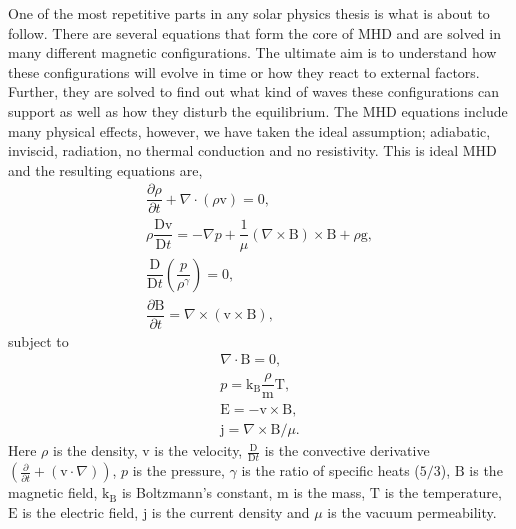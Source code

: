    One of the most repetitive parts in any solar physics thesis is what is about to follow.
    There are several equations that form the core of MHD and are solved in many different magnetic configurations. 
    The ultimate aim is to understand how these configurations will evolve in time or how they react to external factors.
    Further, they are solved to find out what kind of waves these configurations can support as well as how they disturb the equilibrium. 
    The MHD equations include many physical effects, however, we have taken the ideal assumption; adiabatic, inviscid, radiation, no thermal conduction and no resistivity.
    This is ideal MHD and the resulting equations are,
    \begin{align}                                                         
        \dfrac{\partial \rho }{\partial t} + \nabla \cdot (\rho \boldsymbol{\mathrm{v}}) =       
        0,\tag{Mass Conservation}\\                                  
        \rho \dfrac{\mathrm{D}\boldsymbol{\mathrm{v}}}{\mathrm{D}t} =
        -\nabla p + \dfrac{1}{\mu}(\nabla \times \boldsymbol{\mathrm{B}}) \times \boldsymbol{\mathrm{B}} + \rho \boldsymbol{\mathrm{g}},\tag{Equation of Motion}\\
        \dfrac{\mathrm{D}}{\mathrm{D}t} \left(\dfrac{p}{\rho^\gamma} \right)  = 0,\tag{Energy Equation}\\       
        \dfrac{\partial \boldsymbol{\mathrm{B}}}{\partial t} = \nabla \times (\boldsymbol{\mathrm{v}} \times \boldsymbol{\mathrm{B}}),\tag{Induction Equation}               
    \end{align}
    subject to
    \begin{align}
        \nabla \cdot \boldsymbol{\mathrm{B}} = 0,\tag{Solenoid Equation}\\
        p = \mathrm{k_B} \dfrac{\rho}{\mathrm{m}} \mathrm{T},\tag{Ideal Gas Law}\\  
        \boldsymbol{\mathrm{E}} = - \boldsymbol{\mathrm{v}} \times \boldsymbol{\mathrm{B}},\tag{Ohm's Law}\\
        \boldsymbol{\mathrm{j}} = \nabla \times \boldsymbol{\mathrm{B}}/ \mu.\tag{Electric Current}                          
    \end{align}
    Here $\rho$ is the density, $\boldsymbol{\mathrm{v}}$ is the velocity, $\frac{\mathrm{D}}{\mathrm{D}t}$ is the convective derivative $\left(\frac{\partial}{\partial t} + (\boldsymbol{\mathrm{v}}\cdot\nabla)\right)$, $p$ is the pressure, $\gamma$ is the ratio of specific heats ($5/3$), $\boldsymbol{\mathrm{B}}$ is the magnetic field, $\mathrm{k_B}$ is Boltzmann's constant, $\mathrm{m}$ is the mass, $\mathrm{T}$ is the temperature, $\boldsymbol{\mathrm{E}}$ is the electric field, $\boldsymbol{\mathrm{j}}$ is the current density and $\mu$ is the vacuum permeability. 

